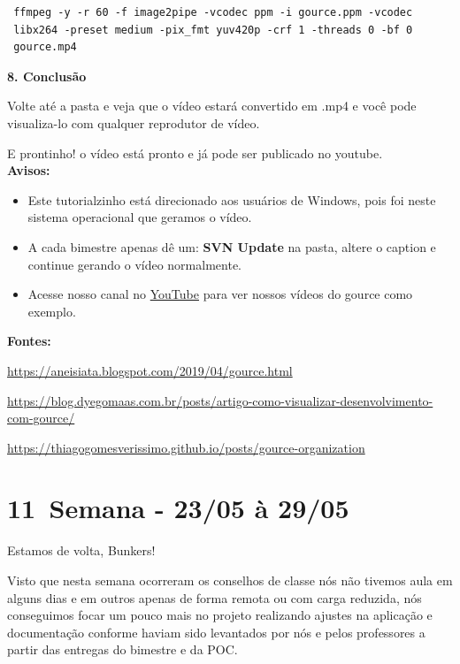 \lstset{language=Fortran,
             basicstyle=\ttfamily\small,
             showstringspaces=false
    }
        \begin{lstlisting} 
 ffmpeg -y -r 60 -f image2pipe -vcodec ppm -i gource.ppm -vcodec 
 libx264 -preset medium -pix_fmt yuv420p -crf 1 -threads 0 -bf 0 
 gource.mp4
        \end{lstlisting} 

\textbf{8. Conclusão}

Volte até a pasta e veja que o vídeo estará convertido em .mp4 e você pode visualiza-lo com qualquer reprodutor de vídeo.

E prontinho! o vídeo está pronto e já pode ser publicado no \gls{youtube}. \\

\textbf{Avisos:}
\begin{itemize}
    \item Este tutorialzinho está direcionado aos usuários de Windows, pois foi neste sistema operacional que geramos o vídeo. 
    \item A cada bimestre apenas dê um: \textbf{SVN Update} na pasta, altere o caption e continue gerando o vídeo normalmente.
    \item Acesse nosso canal no \href{https://www.youtube.com/channel/UCOJVZlclPTqngZQwPS9Fvpg/featured}{YouTube} para ver nossos vídeos do \gls{gource} como exemplo.
\end{itemize}

\textbf{Fontes:}

\noindent\href{https://aneisiata.blogspot.com/2019/04/gource.html}{https://aneisiata.blogspot.com/2019/04/gource.html}

\noindent\href{https://blog.dyegomaas.com.br/posts/artigo-como-visualizar-desenvolvimento-com-gource/}{https://blog.dyegomaas.com.br/posts/artigo-como-visualizar-desenvolvimento-com-gource/}

\noindent\href{https://thiagogomesverissimo.github.io/posts/gource-organization}{https://thiagogomesverissimo.github.io/posts/gource-organization}


\section{11\textordfeminine \, Semana - 23/05 à 29/05}
Estamos de volta, Bunkers!

Visto que nesta semana ocorreram os conselhos de classe nós não tivemos aula em alguns dias e em outros apenas de forma remota ou com carga reduzida, nós conseguimos focar um pouco mais no projeto realizando ajustes na aplicação e documentação conforme haviam sido levantados por nós e pelos professores a partir das entregas do bimestre e da \acs{POC}.

